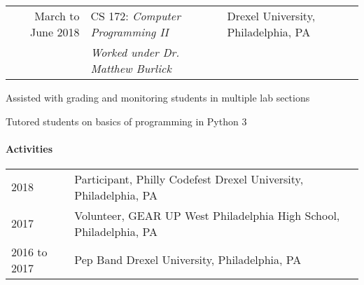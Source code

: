 \documentclass[10pt,]{article}
\let\oldparagraph\paragraph
\renewcommand{\paragraph}[1]{\oldparagraph{#1}\mbox{}}
\begin{document}
\begin{tabularx}{\textwidth}{r | l X}
March to June 2018 & CS 172: \textit{Computer Programming II} & \hfill Drexel University, Philadelphia, PA\\
           & \textit{Worked under Dr. Matthew Burlick}
\end{tabularx}
\begin{list}{\quad}
    \item Assisted with grading and monitoring students in multiple lab sections
    \item Tutored students on basics of programming in Python 3
\end{list}

\hypertarget{activities}{%
\paragraph{Activities}\label{activities}}

\begin{tabularx}{\textwidth}{l | X}
    2018         & Participant, Philly Codefest \hfill Drexel University, Philadelphia, PA\\
    2017         & Volunteer, GEAR UP \hfill West Philadelphia High School, Philadelphia, PA\\
    2016 to 2017 & Pep Band \hfill Drexel University, Philadelphia, PA
\end{tabularx}
\end{document}
